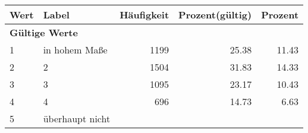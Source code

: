      \begin{longtable}{lXrrr}
     \toprule
     \textbf{Wert} & \textbf{Label} & \textbf{Häufigkeit} & \textbf{Prozent(gültig)} & \textbf{Prozent} \\
     \endhead
     \midrule
     \multicolumn{5}{l}{\textbf{Gültige Werte}}\\

     1 &
     \multicolumn{1}{X}{ in hohem Maße   } &


       \num{1199} &
       \num[round-mode=places,round-precision=2]{25.38} &
         \num[round-mode=places,round-precision=2]{11.43} \\

     2 &
     \multicolumn{1}{X}{ 2   } &


       \num{1504} &
       \num[round-mode=places,round-precision=2]{31.83} &
         \num[round-mode=places,round-precision=2]{14.33} \\

     3 &
     \multicolumn{1}{X}{ 3   } &


       \num{1095} &
       \num[round-mode=places,round-precision=2]{23.17} &
         \num[round-mode=places,round-precision=2]{10.43} \\

     4 &
     \multicolumn{1}{X}{ 4   } &


       \num{696} &
       \num[round-mode=places,round-precision=2]{14.73} &
         \num[round-mode=places,round-precision=2]{6.63} \\

     5 &
     \multicolumn{1}{X}{ überhaupt nicht   } &



\end{longtable}
